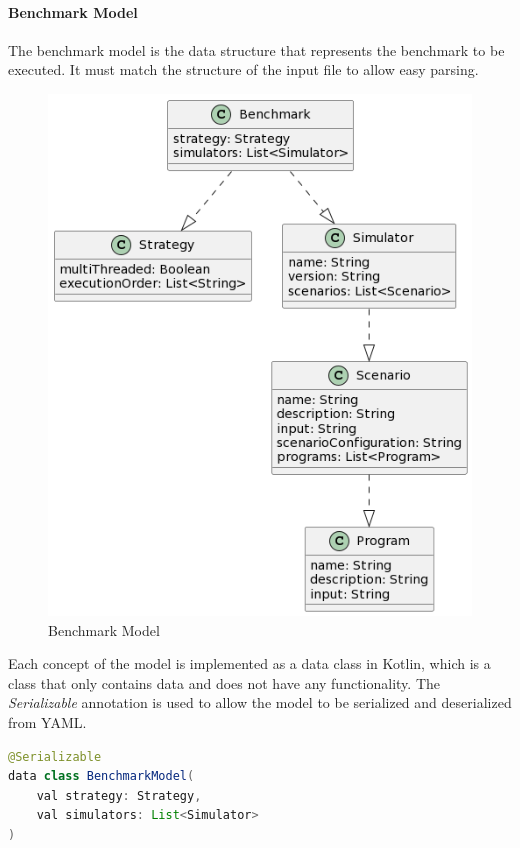 \documentclass[12pt,a4paper,openright,twoside]{book}
\begin{document}
\paragraph*{Benchmark Model}
The benchmark model is the data structure that represents the benchmark to be executed.
It must match the structure of the input file to allow easy parsing.

\begin{figure}[h!]
  \centering
  \includegraphics[width=\textwidth]{figures/benchmark-model.png}
  \caption{Benchmark Model}
  \label{fig:benchmark-model}
\end{figure}

Each concept of the model is implemented as a data class in Kotlin, which is a class that only contains data and does not have any functionality.
The \emph{Serializable} annotation is used to allow the model to be serialized and deserialized from YAML.

\begin{lstlisting}[language=Java]
@Serializable
data class BenchmarkModel(
    val strategy: Strategy,
    val simulators: List<Simulator>
)
\end{lstlisting}
\end{document}
